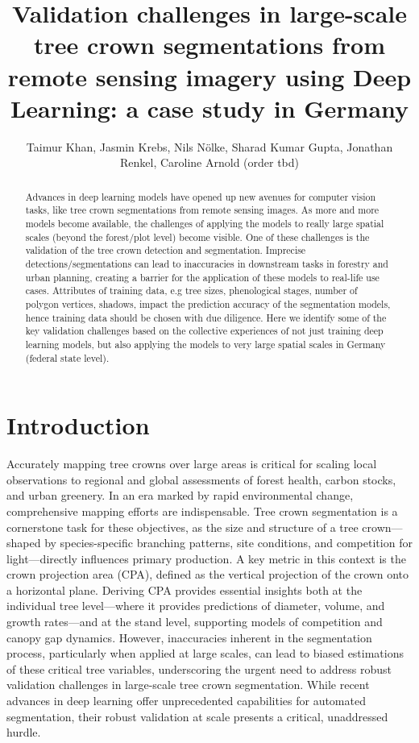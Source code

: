 \documentclass[runningheads]{llncs}
\title{Validation challenges in large-scale tree crown segmentations
from remote sensing imagery using Deep Learning: a case study in
Germany}
\author{Taimur Khan, Jasmin Krebs, Nils Nölke, Sharad Kumar Gupta,
Jonathan Renkel, Caroline Arnold (order tbd)}
\institute{}
\begin{document}
\maketitle

\begin{abstract}
Advances in deep learning models have opened up new avenues for computer
vision tasks, like tree crown segmentations from remote sensing images.
As more and more models become available, the challenges of applying the
models to really large spatial scales (beyond the forest/plot level)
become visible. One of these challenges is the validation of the tree
crown detection and segmentation. Imprecise detections/segmentations can
lead to inaccuracies in downstream tasks in forestry and urban planning,
creating a barrier for the application of these models to real-life use
cases. Attributes of training data, e.g tree sizes, phenological stages,
number of polygon vertices, shadows, impact the prediction accuracy of
the segmentation models, hence training data should be chosen with due
diligence. Here we identify some of the key validation challenges based
on the collective experiences of not just training deep learning models,
but also applying the models to very large spatial scales in Germany
(federal state level).


\end{abstract}



\section{Introduction}\label{introduction}

Accurately mapping tree crowns over large areas is critical for scaling
local observations to regional and global assessments of forest health,
carbon stocks, and urban greenery. In an era marked by rapid
environmental change, comprehensive mapping efforts are indispensable.
Tree crown segmentation is a cornerstone task for these objectives, as
the size and structure of a tree crown---shaped by species-specific
branching patterns, site conditions, and competition for
light---directly influences primary production. A key metric in this
context is the crown projection area (CPA), defined as the vertical
projection of the crown onto a horizontal plane. Deriving CPA provides
essential insights both at the individual tree level---where it provides
predictions of diameter, volume, and growth rates---and at the stand
level, supporting models of competition and canopy gap dynamics.
However, inaccuracies inherent in the segmentation process, particularly
when applied at large scales, can lead to biased estimations of these
critical tree variables, underscoring the urgent need to address robust
validation challenges in large-scale tree crown segmentation. While
recent advances in deep learning offer unprecedented capabilities for
automated segmentation, their robust validation at scale presents a
critical, unaddressed hurdle.
\end{document}
